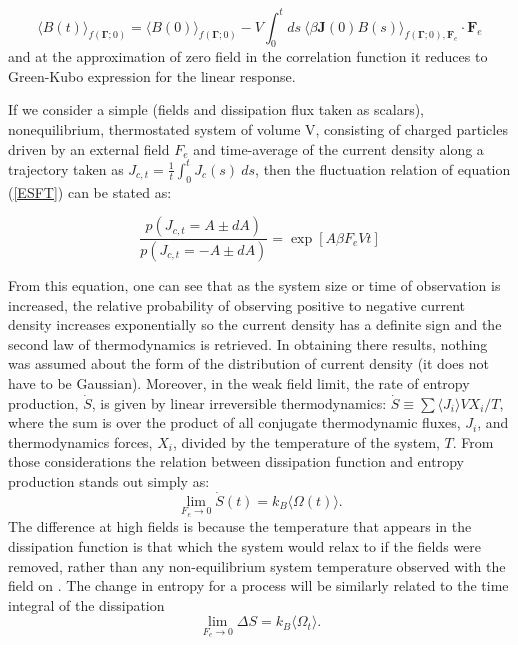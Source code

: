 \documentclass[a4paper,12pt]{article}
\begin{document}
\begin{equation}
  \langle B(t) \rangle_{f(\bm{\Gamma};0)}=\langle B(0) \rangle_{f(\bm{\Gamma};0)} - V \int_0^t ds\ \langle \beta \bm{J}(0)B(s)\rangle_{f(\bm{\Gamma};0),\bm{F}_e} \cdot \bm{F}_e
\end{equation}
and at the approximation of zero field in the correlation function it reduces to Green-Kubo expression for the linear response.


If we consider a simple (fields and dissipation flux taken as scalars), nonequilibrium, thermostated system of volume V, consisting of charged particles driven by an external field $F_e$ and time-average of the current density along a trajectory taken as $J_{c,t}= \frac{1}{t}\int_0^t J_c(s)\ ds$, then the fluctuation relation of equation (\ref{ESFT}) can be stated as:

\begin{equation}
  \frac{p(J_{c,t}=A\pm dA)}{p(J_{c,t}=-A\pm dA)}= \exp[A \beta F_e V t]
\end{equation}

From this equation, one can see that as the system size or time of observation is increased, the relative probability of observing positive to negative current density increases exponentially so the current density has a definite sign and the second law of thermodynamics is retrieved. In obtaining there results, nothing was assumed about the form of the distribution of current density (it does not have to be Gaussian). Moreover, in the weak field limit, the rate of entropy production, $\dot{S}$, is given by linear irreversible thermodynamics: $\dot{S} \equiv \sum \langle J_i \rangle V X_i/T$, where the sum is over the product of all conjugate thermodynamic fluxes, $J_i$, and thermodynamics forces, $X_i$, divided by the temperature of the system, $T$. From those considerations the relation between dissipation function and entropy production stands out simply as:
\begin{equation}
  \lim_{F_e \to 0} \dot{S}(t) = k_B \langle \Omega(t) \rangle.
\end{equation}
The difference at high fields is because the temperature that appears in the dissipation function is that which the system would relax to if the fields were removed, rather than any non-equilibrium system temperature observed with the field on \cite{Evans:2241458}. The change in entropy for a process will be similarly related to the time integral of the dissipation
\begin{equation}
  \lim_{F_e \to 0} \Delta S= k_B \langle \Omega_t \rangle.
\end{equation}
\end{document}
